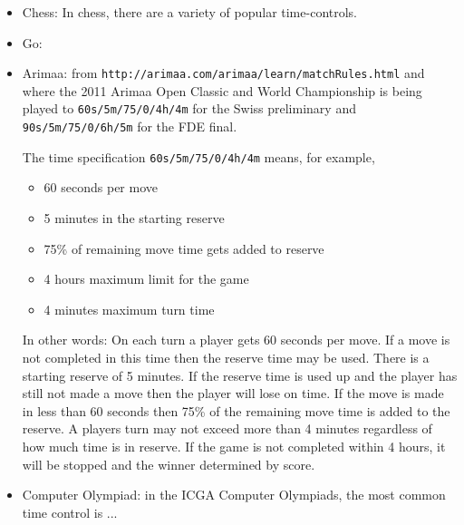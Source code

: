\documentclass[10pt,dvipdfmx]{report}
\begin{document}
\begin{itemize}
\item Chess: In chess, there are a variety of popular time-controls.
\item Go:
\item Arimaa: from {\tt http://arimaa.com/arimaa/learn/matchRules.html}
and where the 2011 Arimaa Open Classic and World Championship
is being played to {\tt 60s/5m/75/0/4h/4m} for the Swiss preliminary and
{\tt 90s/5m/75/0/6h/5m} for the FDE final.

The time specification {\tt 60s/5m/75/0/4h/4m} means, for example,
  \begin{itemize}
  \item 60 seconds per move
  \item 5 minutes in the starting reserve
  \item 75\% of remaining move time gets added to reserve
  \item 4 hours maximum limit for the game
  \item 4 minutes maximum turn time 
  \end{itemize}
In other words:
On each turn a player gets 60 seconds per move.
If a move is not completed in this time then the reserve time may be used.
There is a starting reserve of 5 minutes.
If the reserve time is used up and the player has still not made a move then the player will lose on time.
If the move is made in less than 60 seconds then 75\% of the remaining move time is added to the reserve.
A players turn may not exceed more than 4 minutes regardless of how much time is in reserve.
If the game is not completed within 4 hours, it will be stopped and the winner determined by score.
\item Computer Olympiad: in the ICGA Computer Olympiads, the most common time control is ...
\end{itemize}
\end{document}
